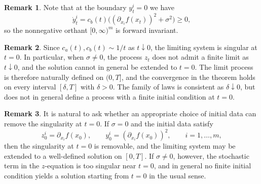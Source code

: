 \documentclass[11pt, a4paper,leqno]{amsart}
\theoremstyle{definition}
\newtheorem{remark}{Remark}[section]
\numberwithin{equation}{section}
\begin{document}
\begin{remark}\label{suppa}
Note that  at the boundary $y_t^i=0$ we have
\[
\dot y_t^i = c_b(t)\bigl((\partial_{x_i}f(x_t))^2+\sigma^2\bigr) \ge 0,
\]
so the nonnegative orthant $[0,\infty)^m$ is forward invariant.
\end{remark}


\begin{remark}
Since $c_a(t),c_b(t)\sim 1/t$ as $t\downarrow 0$, the limiting system is singular at $t=0$.
In particular, when $\sigma\neq 0$, the process $z_t$ does not admit a finite limit as $t\downarrow 0$, and the solution cannot in general be extended to $t=0$. The limit process is therefore naturally defined on $(0,T]$, and the convergence in the theorem holds on every interval $[\delta,T]$ with $\delta>0$. The family of laws is consistent as $\delta\downarrow 0$, but does not in general define a process with a finite initial condition at $t=0$.
\end{remark}
\begin{remark}
It is natural to ask whether an appropriate choice of initial data can remove the singularity at $t=0$. If $\sigma=0$ and the initial data satisfy
\[
z_0^i=\partial_{x_i}f(x_0),\qquad
y_0^i=(\partial_{x_i}f(x_0))^2,\qquad i=1,\dots,m,
\]
then the singularity at $t=0$ is removable, and the limiting system may be extended to a well-defined solution on $[0,T]$. If $\sigma\neq 0$, however, the stochastic term in the $z$-equation is too singular near $t=0$, and in general no finite initial condition yields a solution starting from $t=0$ in the usual sense.
\end{remark}
\end{document}

